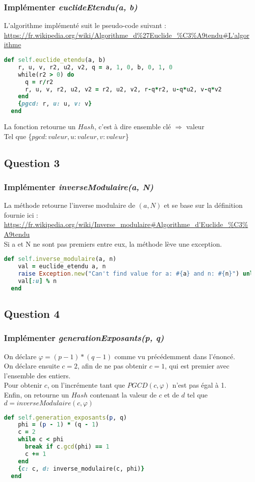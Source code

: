\documentclass[a4paper,10pt]{article}
\begin{document}
\subsubsection{Implémenter \textit{euclideEtendu(a, b)}}
L'algorithme implémenté suit le pseudo-code suivant :\\
 \url{https://fr.wikipedia.org/wiki/Algorithme_d%27Euclide_%C3%A9tendu#L'algorithme}\\
 \begin{lstlisting}[language=Ruby]
   def self.euclide_etendu(a, b)
    r, u, v, r2, u2, v2, q = a, 1, 0, b, 0, 1, 0
    while(r2 > 0) do
      q = r/r2
      r, u, v, r2, u2, v2 = r2, u2, v2, r-q*r2, u-q*u2, v-q*v2
    end
    {pgcd: r, u: u, v: v}
  end
\end{lstlisting}
La fonction retourne un $Hash$, c'est à dire ensemble clé $\Rightarrow$ valeur\\
Tel que \{$pgcd: valeur, u: valeur, v: valeur$\}

\clearpage
\subsection{Question 3}
\subsubsection{Implémenter \textit{inverseModulaire(a, N)}}
La méthode retourne l'inverse modulaire de $(a, N)$ et se base sur la définition fournie ici :\\
\url{https://fr.wikipedia.org/wiki/Inverse_modulaire#Algorithme_d'Euclide_%C3%A9tendu}\\
Si a et N ne sont pas premiers entre eux, la méthode lève une exception.
\begin{lstlisting}[language=Ruby]
  def self.inverse_modulaire(a, n)
    val = euclide_etendu a, n
    raise Exception.new("Can't find value for a: #{a} and n: #{n}") unless val[:pgcd] == 1
    val[:u] % n
  end
\end{lstlisting}

\subsection{Question 4}
\subsubsection{Implémenter \textit{generationExposants(p, q)}}
On déclare $\varphi = (p-1)*(q-1)$ comme vu précédemment dans l'énoncé.\\
On déclare ensuite $c = 2$, afin de ne pas obtenir $c=1$, qui est premier avec l'ensemble des entiers.\\
Pour obtenir $c$, on l'incrémente tant que $PGCD(c, \varphi)$ n'est pas égal à 1.\\
Enfin, on retourne un $Hash$ contenant la valeur de $c$ et de $d$ tel que $d = inverseModulaire(c, \varphi)$
\begin{lstlisting}[language=Ruby]
  def self.generation_exposants(p, q)
    phi = (p - 1) * (q - 1)
    c = 2
    while c < phi
      break if c.gcd(phi) == 1
      c += 1
    end
    {c: c, d: inverse_modulaire(c, phi)}
  end
\end{lstlisting}
\end{document}
